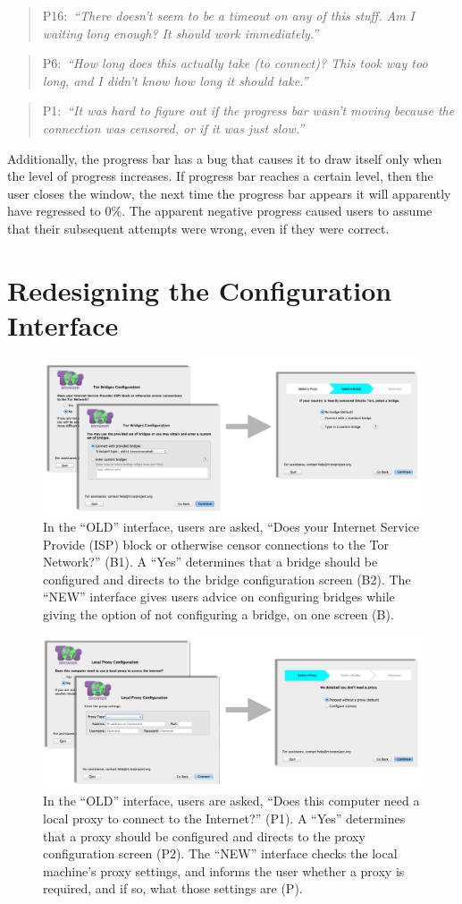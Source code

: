 \documentclass[USenglish,oneside,twocolumn]{article}
\newcommand{\pquote}[2]{
\begin{quotation}
\noindent #1:~\textit{``#2''}
\end{quotation}
}
\begin{document}
\pquote{P16}{There doesn't seem to be a timeout on any of this stuff. Am I waiting long enough? It should work immediately.}
\pquote{P6}{How long does this actually take (to connect)? This took way too long, and I didn't know how long it should take.}
\pquote{P1}{It was hard to figure out if the progress bar wasn't moving because the connection was censored, or if it was just slow.}

Additionally, the progress bar has a bug
that causes it to draw itself only when the level of progress increases.
If progress bar reaches a certain level,
then the user closes the window,
the next time the progress bar appears it will apparently have regressed to 0\%.
The apparent negative progress caused users to assume that their subsequent attempts were wrong, even if they were correct. 

\section{Redesigning the Configuration Interface}
\label{redesign} 
 \begin{figure}[t]
	\centering
		\includegraphics[width=.8\textwidth]{bridge-screens.pdf} 
		\caption{In the ``OLD'' interface, users are asked, ``Does your Internet Service Provide (ISP) block or 
		otherwise censor connections to the Tor Network?'' (B1). A ``Yes'' determines that a bridge should 
		be configured and directs to the bridge configuration screen (B2). 
		The ``NEW'' interface gives users advice on configuring bridges
		while giving the option of not configuring a bridge, on one screen (B).} 
\end{figure} 

\begin{figure}[t]
	\centering
		\includegraphics[width=.8\textwidth]{proxy-screens.pdf} 
		\caption{In the ``OLD'' interface, users are asked, ``Does this computer need a local proxy to connect
		to the Internet?'' (P1). A ``Yes'' determines that a proxy should be configured and directs to the 
		proxy configuration screen (P2). The ``NEW'' interface checks the local machine's proxy settings,
		and informs the user whether a proxy is required, and if so, what those settings are (P).}
\end{figure}
\end{document}
